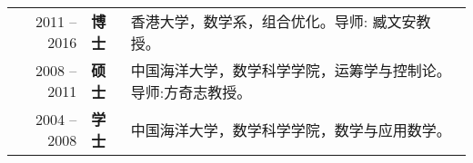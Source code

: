 %
%


\begin{tabular}{rll}	
	2011 -- 2016  &  \textbf{博士} &香港大学，数学系，组合优化。导师: 臧文安教授。\\
	2008 -- 2011  &  \textbf{硕士} &中国海洋大学，数学科学学院，运筹学与控制论。 导师:方奇志教授。\\
	2004 -- 2008  &  \textbf{学士} &中国海洋大学，数学科学学院，数学与应用数学。
\end{tabular}